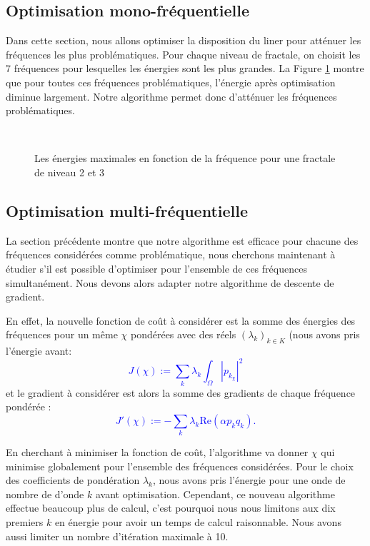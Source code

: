 \subsection{Optimisation mono-fréquentielle}

Dans cette section, nous allons optimiser la disposition du liner pour atténuer les fréquences les plus problématiques. Pour chaque niveau de fractale, on choisit les 7 fréquences pour lesquelles les énergies sont les plus grandes. La Figure \ref{freq1} montre que pour toutes ces fréquences problématiques, l'énergie après optimisation diminue largement. Notre algorithme permet donc d'atténuer les fréquences problématiques.

\begin{figure}[H]
    \centering
    \\
    \caption{Les énergies maximales en fonction de la fréquence pour une fractale de niveau 2 et 3}
    \label{freq1}
\end{figure}

\subsection{Optimisation multi-fréquentielle}
La section précédente montre que notre algorithme est efficace pour chacune des fréquences considérées comme problématique, nous cherchons maintenant à étudier s'il est possible d'optimiser pour l'ensemble de ces fréquences simultanément. Nous devons alors adapter notre algorithme de descente de gradient. 

En effet, la nouvelle fonction de coût à considérer est la somme des énergies des fréquences pour un même $\chi$ pondérées avec des réels $(\lambda_{k})_{k \in K}$ (nous avons pris l'énergie avant: \textcolor{blue}{$$J(\chi) := \sum_{k} \lambda_{k} \int_\Omega |p_{k_{\chi}}|^2$$} et le gradient à considérer est alors la somme des gradients de chaque fréquence pondérée : \textcolor{blue}{$$J'(\chi) := - \sum_{k} \lambda_{k} \text{Re}(\alpha p_{k} q_{k}).$$}

En cherchant à minimiser la fonction de coût, l'algorithme va donner $\chi $ qui minimise globalement pour l'ensemble des fréquences considérées. Pour le choix des coefficients de pondération $\lambda_{k}$, nous avons pris l'énergie pour une onde de nombre de d'onde $k$ avant optimisation. 
Cependant, ce nouveau algorithme effectue beaucoup plus de calcul, c'est pourquoi nous nous limitons aux dix premiers $k$ en énergie pour avoir un temps de calcul raisonnable. Nous avons aussi limiter un nombre d'itération maximale à 10.


